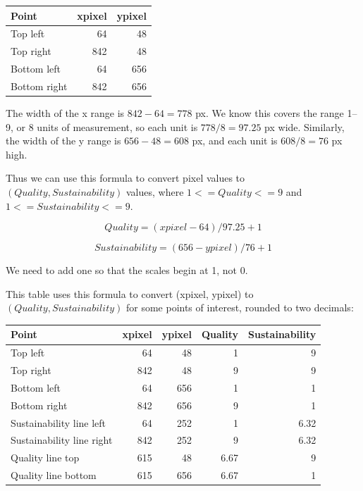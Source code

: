 \documentclass[article,10pt,microtype]{article}
\begin{document}
\begin{center}
\begin{tabular}{lrr}
Point & xpixel & ypixel\\
\hline
Top left & 64 & 48\\
Top right & 842 & 48\\
Bottom left & 64 & 656\\
Bottom right & 842 & 656\\
\end{tabular}
\end{center}

The width of the x range is \(842 - 64 = 778\) px.  We know this covers the range 1--9, or 8 units of measurement, so each unit is \( 778 / 8 = 97.25\) px wide.  Similarly, the width of the y range is \(656 - 48 = 608\) px, and each unit is \(608 / 8 = 76 \) px high.

Thus we can use this formula to convert pixel values to \((Quality, Sustainability)\) values, where \( 1 <= Quality <= 9\) and \(1 <= Sustainability <= 9\).

\begin{equation}
Quality = (xpixel - 64)/97.25 + 1
\end{equation}

\begin{equation}
Sustainability = (656 - ypixel)/76 + 1
\end{equation}

We need to add one so that the scales begin at 1, not 0.

This table uses this formula to convert (xpixel, ypixel) to \((Quality, Sustainability)\) for some points of interest, rounded to two decimals:

\begin{center}
\begin{tabular}{lrrrr}
Point & xpixel & ypixel & Quality & Sustainability\\
\hline
Top left & 64 & 48 & 1 & 9\\
Top right & 842 & 48 & 9 & 9\\
Bottom left & 64 & 656 & 1 & 1\\
Bottom right & 842 & 656 & 9 & 1\\
Sustainability line left & 64 & 252 & 1 & 6.32\\
Sustainability line right & 842 & 252 & 9 & 6.32\\
Quality line top & 615 & 48 & 6.67 & 9\\
Quality line bottom & 615 & 656 & 6.67 & 1\\
\end{tabular}
\end{center}
\end{document}
